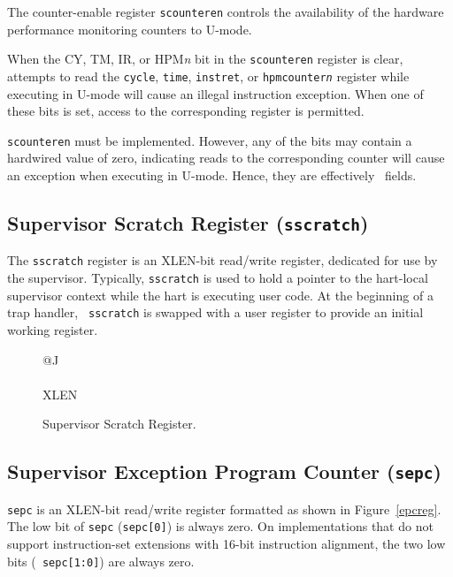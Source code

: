 The counter-enable register {\tt scounteren} controls
the availability of the
hardware performance monitoring counters to U-mode.

When the CY, TM, IR, or HPM{\em n} bit in the {\tt scounteren} register is
clear, attempts to read the {\tt cycle}, {\tt time}, {\tt instret}, or
{\tt hpmcounter{\em n}} register while executing in U-mode
will cause an illegal instruction exception.  When one of these bits is set,
access to the corresponding register is permitted.

{\tt scounteren} must be implemented.  However, any of the bits may contain
a hardwired value of zero, indicating reads to the corresponding counter will
cause an exception when executing in U-mode.
Hence, they are effectively \warl\ fields.

\subsection{Supervisor Scratch Register ({\tt sscratch})}

The {\tt sscratch} register is an XLEN-bit read/write register,
dedicated for use by the supervisor.  Typically, {\tt sscratch} is
used to hold a pointer to the hart-local supervisor context while the
hart is executing user code.  At the beginning of a trap handler, {\tt
  sscratch} is swapped with a user register to provide an initial
working register.

\begin{figure}[h!]
{\footnotesize
\begin{center}
\begin{tabular}{@{}J}
 \\
\hline
{} \\
\hline
XLEN \\
\end{tabular}
\end{center}
}
\vspace{-0.1in}
\caption{Supervisor Scratch Register.}
\label{kregs}
\end{figure}

\subsection{Supervisor Exception Program Counter ({\tt sepc})}

{\tt sepc} is an XLEN-bit read/write register formatted as shown in
Figure~\ref{epcreg}.  The low bit of {\tt sepc} ({\tt sepc[0]}) is
always zero.  On implementations that do not support instruction-set
extensions with 16-bit instruction alignment, the two low bits ({\tt
  sepc[1:0]}) are always zero.

